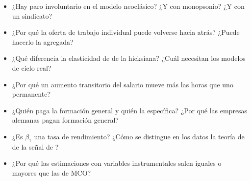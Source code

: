 \documentclass[11pt]{article}
\begin{document}
\begin{itemize}
\item ¿Hay paro involuntario en el modelo neoclásico? ¿Y con monopsonio? ¿Y con un sindicato?
\item ¿Por qué la oferta de trabajo individual puede volverse hacia atrás? ¿Puede hacerlo la agregada?
\item ¿Qué diferencia la elasticidad de  de la hicksiana? ¿Cuál necesitan los modelos de ciclo real?
\item ¿Por qué un aumento transitorio del salario mueve más las horas que uno permanente?
\item ¿Quién paga la formación general y quién la específica? ¿Por qué las empresas alemanas pagan formación general?
\item ¿Es $\beta_1$ una tasa de rendimiento? ¿Cómo se distingue en los datos la teoría de  de la señal de ?
\item ¿Por qué las estimaciones con variables instrumentales salen iguales o mayores que las de MCO?
\end{itemize}

\nocite{Cahuc2014Labor,ICEXCECO3A25,Becker1964Human}

\bibliografia
\end{document}
